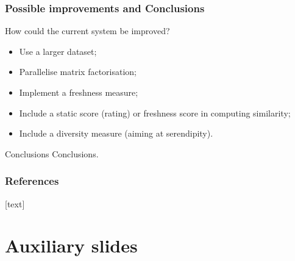 \documentclass[xcolor = {table}]{beamer}
\begin{document}
  \begin{frame}
    \frametitle{Possible improvements and Conclusions}

    How could the current system be improved?

    \vspace{0.5em}

    \begin{itemize}
      \setlength\itemsep{0.5em}
      \item Use a larger dataset;
      \item Parallelise matrix factorisation;
      \item Implement a freshness measure;
      \item Include a static score (rating) or freshness score in computing similarity;
      \item Include a diversity measure (aiming at serendipity).
    \end{itemize}

    \vspace{2em}

    \begin{block}{Conclusions}
      Conclusions.
    \end{block}

  \end{frame}



  \begin{frame}
    \frametitle{References}

    \nocite{*}

    [text]

    
    \footnotesize{
       
    }
  \end{frame}

  

  \appendix
  \backupbegin

  \section{Auxiliary slides}
\end{document}
